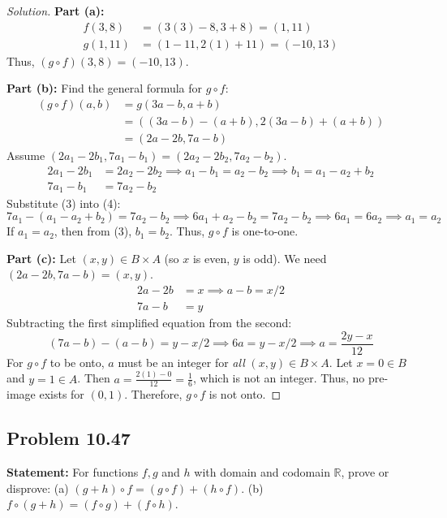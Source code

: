 \documentclass[11pt, a4paper]{article}
\theoremstyle{definition}
\theoremstyle{remark}
\newcommand{\R}{\mathbb{R}}
\begin{document}
\begin{proof}[Solution]
\textbf{Part (a):}
\begin{align*}
    f(3, 8) &= (3(3) - 8, 3 + 8) = (1, 11) \\
    g(1, 11) &= (1 - 11, 2(1) + 11) = (-10, 13)
\end{align*}
Thus, $(g \circ f)(3, 8) = (-10, 13)$.

\textbf{Part (b):} Find the general formula for $g \circ f$:
\begin{align*}
    (g \circ f)(a, b) &= g(3a - b, a + b) \\
    &= ((3a - b) - (a + b), 2(3a - b) + (a + b)) \\
    &= (2a - 2b, 7a - b)
\end{align*}
Assume $(2a_1 - 2b_1, 7a_1 - b_1) = (2a_2 - 2b_2, 7a_2 - b_2)$.
\begin{align}
    2a_1 - 2b_1 &= 2a_2 - 2b_2 \implies a_1 - b_1 = a_2 - b_2 \implies b_1 = a_1 - a_2 + b_2 \\
    7a_1 - b_1 &= 7a_2 - b_2
\end{align}
Substitute (3) into (4):
\[ 7a_1 - (a_1 - a_2 + b_2) = 7a_2 - b_2 \implies 6a_1 + a_2 - b_2 = 7a_2 - b_2 \implies 6a_1 = 6a_2 \implies a_1 = a_2 \]
If $a_1 = a_2$, then from (3), $b_1 = b_2$. Thus, $g \circ f$ is one-to-one.

\textbf{Part (c):} Let $(x, y) \in B \times A$ (so $x$ is even, $y$ is odd). We need $(2a - 2b, 7a - b) = (x, y)$.
\begin{align*}
    2a - 2b &= x \implies a - b = x/2 \\
    7a - b &= y
\end{align*}
Subtracting the first simplified equation from the second:
\[ (7a - b) - (a - b) = y - x/2 \implies 6a = y - x/2 \implies a = \frac{2y - x}{12} \]
For $g \circ f$ to be onto, $a$ must be an integer for \textit{all} $(x, y) \in B \times A$. Let $x = 0 \in B$ and $y = 1 \in A$. Then $a = \frac{2(1) - 0}{12} = \frac{1}{6}$, which is not an integer. Thus, no pre-image exists for $(0, 1)$. Therefore, $g \circ f$ is not onto.
\end{proof}

\subsection*{Problem 10.47}
\textbf{Statement:} For functions $f, g$ and $h$ with domain and codomain $\R$, prove or disprove:
(a) $(g + h) \circ f = (g \circ f) + (h \circ f)$.
(b) $f \circ (g + h) = (f \circ g) + (f \circ h)$.
\end{document}
